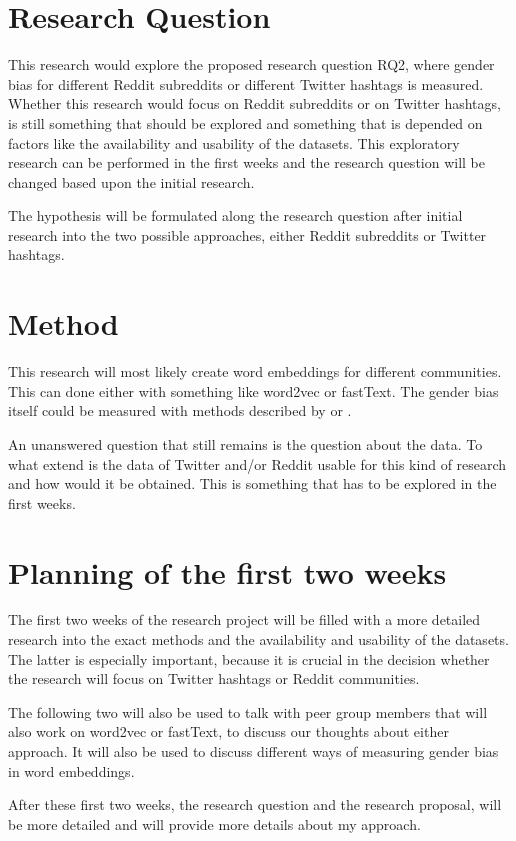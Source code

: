 \documentclass[english, a4paper, 11pt]{article}
\begin{document}
\section*{Research Question}
This research would explore the proposed research question RQ2, where gender bias for different Reddit subreddits or different Twitter hashtags is measured. Whether this research
would focus on Reddit subreddits or on Twitter hashtags, is still something that should be
explored and something that is depended on factors like the availability and usability of
the datasets. This exploratory research can be performed in the first weeks and the
research question will be changed based upon the initial research.

The hypothesis will be formulated along the research question after initial research into
the two possible approaches, either Reddit subreddits or Twitter hashtags.

\section*{Method}
This research will most likely create word embeddings for different communities. This can
done either with something like word2vec or fastText. The gender bias itself could be
measured with methods described by \cite{bolukbasi_2016_quantifying_stereotypes} or 
\cite{caliskan_2017_semantics_language_corpora}.

An unanswered question that still remains is the question about the data. To what extend
is the data of Twitter and/or Reddit usable for this kind of research and how would it be
obtained. This is something that has to be explored in the first weeks.


\section*{Planning of the first two weeks}
The first two weeks of the research project will be filled with a more detailed research
into the exact methods and the availability and usability of the datasets. The latter is
especially important, because it is crucial in the decision whether the research will
focus on Twitter hashtags or Reddit communities.

The following two will also be used to talk with peer group members that will also work
on word2vec or fastText, to discuss our thoughts about either approach. It will also
be used to discuss different ways of measuring gender bias in word embeddings.

After these first two weeks, the research question and the research proposal, will be
more detailed and will provide more details about my approach.

\printbibliography
\end{document}
